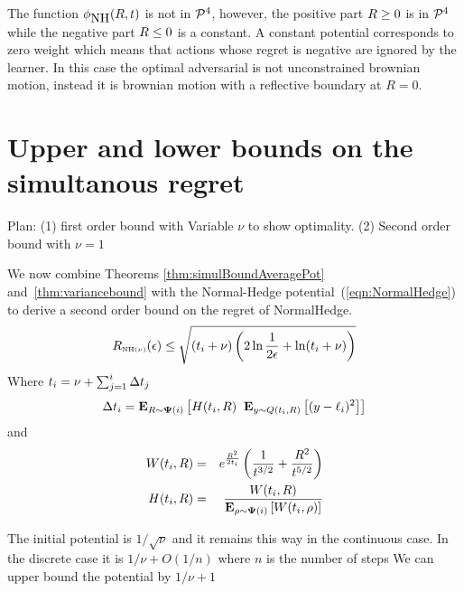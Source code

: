 \documentclass{article}[12pt]
\begin{document}
The function $\phi_{\mbox{NH}}(R,t)$ is not in ${\cal P}^{4}$, however, the
positive part $R\geq 0$ is in ${\cal P}^{4}$ while the negative part
$R \leq 0$ is a constant. A constant potential corresponds to zero weight which means that actions whose regret is negative are ignored by the learner. In this case the optimal adversarial is not unconstrained brownian motion, instead it is brownian motion with a reflective boundary at $R=0$.

\section{Upper and lower bounds on the simultanous regret}
Plan: (1) first order bound with Variable $\nu$ to show optimality.
(2) Second order bound with $\nu=1$

We now combine Theorems \ref{thm:simulBoundAveragePot} and~\ref{thm:variancebound} with
the Normal-Hedge potential~(\ref{eqn:NormalHedge}) to derive a second order bound on the regret of NormalHedge.
\begin{equation}
  R_{\mbox{\tiny NH$(\nu)$}}(\epsilon) \leq \sqrt{(t_i+\nu) \left(2 \ln \frac{1}{2\epsilon}+
      \ln (t_i+\nu)\right)}
\end{equation}
Where $t_i = \nu+\sum_{j=1}^{i}\Delta t_j$
\begin{equation}
  \Delta t_i=
  {\bf E}_{R \sim {\bf \Psi}(i)}\left[ H(t_i,R) \;\; {\bf E}_{y \sim Q(t_i,R)}\left[ (y-\ell_i)^2 \right] \right]
\end{equation}
and 
\begin{eqnarray}
  W(t_i,R)&=& e^{\frac{R^2}{2t_i}} \left(\frac{1}{t^{3/2}} + \frac{R^2}{t^{5/2}} \right)\\
  H(t_i,R)&=& \frac{W(t_i,R)}{{\bf E}_{\rho \sim {\bf \Psi}(i)}\left[ W(t_i,\rho) \right]}
\end{eqnarray}

The initial potential is $1/\sqrt{\nu}$ and it remains this way in the continuous case. In the discrete case it is $1/\nu + O(1/n)$ where $n$ is the number of steps We can upper bound the potential by
$1/\nu+1$





\appendix
\end{document}

